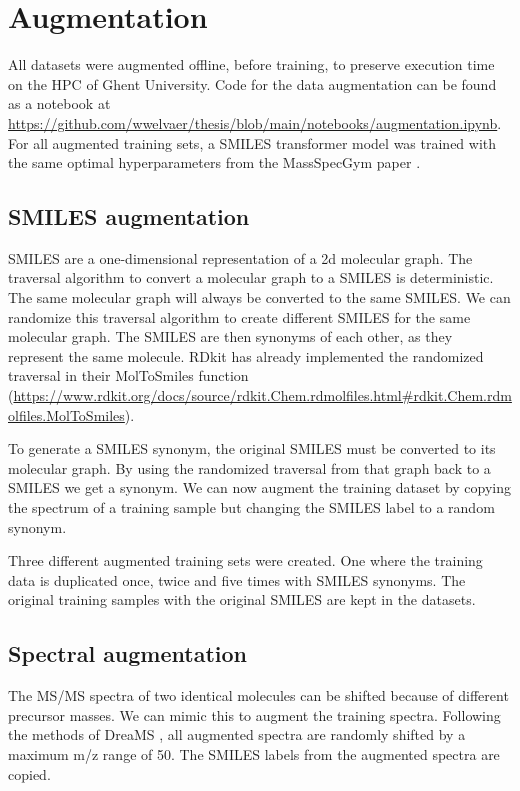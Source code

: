 \section{Augmentation}
\label{sec:augmentation}

All datasets were augmented offline, before training, to preserve execution time on the \ac{HPC} of Ghent University.
Code for the data augmentation can be found as a notebook at \url{https://github.com/wwelvaer/thesis/blob/main/notebooks/augmentation.ipynb}.
For all augmented training sets, a SMILES transformer model was trained with the same optimal hyperparameters from the MassSpecGym paper \cite{bushuiev2024massspecgym}.

\subsection{SMILES augmentation}

SMILES are a one-dimensional representation of a 2d molecular graph.
The traversal algorithm to convert a molecular graph to a SMILES is deterministic.
The same molecular graph will always be converted to the same SMILES.
We can randomize this traversal algorithm to create different SMILES for the same molecular graph.
The SMILES are then synonyms of each other, as they represent the same molecule.
RDkit has already implemented the randomized traversal in their MolToSmiles function (\url{https://www.rdkit.org/docs/source/rdkit.Chem.rdmolfiles.html#rdkit.Chem.rdmolfiles.MolToSmiles}).

To generate a SMILES synonym, the original SMILES must be converted to its molecular graph. 
By using the randomized traversal from that graph back to a SMILES we get a synonym.
We can now augment the training dataset by copying the spectrum of a training sample but changing the SMILES label to a random synonym.

Three different augmented training sets were created. One where the training data is duplicated once, twice and five times with SMILES synonyms.
The original training samples with the original SMILES are kept in the datasets.

\subsection{Spectral augmentation}

The \ac{MS/MS} spectra of two identical molecules can be shifted because of different precursor masses.
We can mimic this to augment the training spectra.
Following the methods of DreaMS \cite{bushuiev2024emergence}, all augmented spectra are randomly shifted by a maximum m/z range of 50.
The SMILES labels from the augmented spectra are copied.


